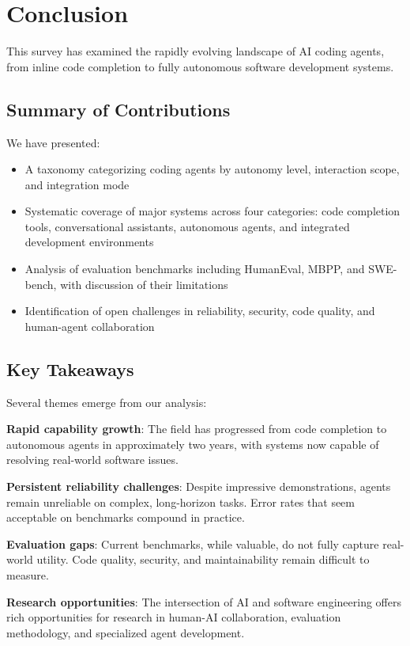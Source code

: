 \section{Conclusion}
\label{sec:conclusion}

This survey has examined the rapidly evolving landscape of AI coding agents, from inline code completion to fully autonomous software development systems.

\subsection{Summary of Contributions}

We have presented:
\begin{itemize}
    \item A taxonomy categorizing coding agents by autonomy level, interaction scope, and integration mode
    \item Systematic coverage of major systems across four categories: code completion tools, conversational assistants, autonomous agents, and integrated development environments
    \item Analysis of evaluation benchmarks including HumanEval, MBPP, and SWE-bench, with discussion of their limitations
    \item Identification of open challenges in reliability, security, code quality, and human-agent collaboration
\end{itemize}

\subsection{Key Takeaways}

Several themes emerge from our analysis:

\textbf{Rapid capability growth}: The field has progressed from code completion to autonomous agents in approximately two years, with systems now capable of resolving real-world software issues.

\textbf{Persistent reliability challenges}: Despite impressive demonstrations, agents remain unreliable on complex, long-horizon tasks. Error rates that seem acceptable on benchmarks compound in practice.

\textbf{Evaluation gaps}: Current benchmarks, while valuable, do not fully capture real-world utility. Code quality, security, and maintainability remain difficult to measure.

\textbf{Research opportunities}: The intersection of AI and software engineering offers rich opportunities for research in human-AI collaboration, evaluation methodology, and specialized agent development.

